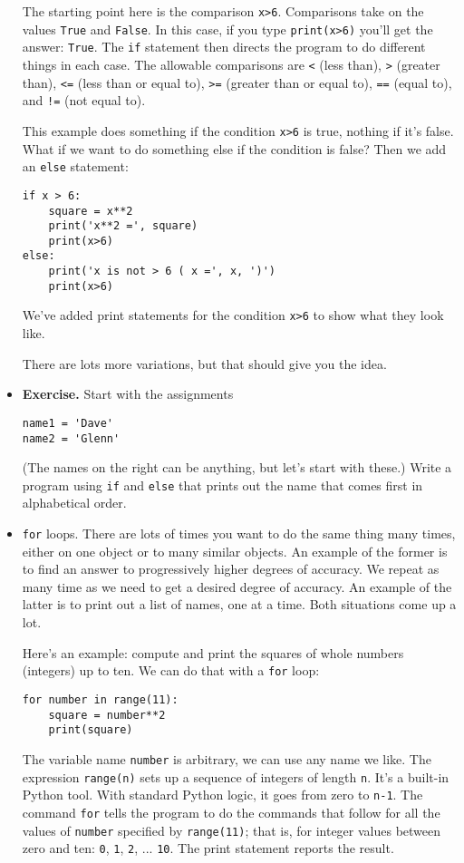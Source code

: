 \documentclass[11pt]{article}
\begin{document}
\begin{itemize}
The starting point here is the comparison {\tt x>6}.
Comparisons take on the values {\tt True} and {\tt False}.
In this case, if you type {\tt print(x>6)} you'll get the answer:  {\tt True}.
The {\tt if} statement then directs the program to do different things in each case.
The allowable comparisons are
{\tt <} (less than), {\tt >} (greater than), {\tt <=} (less than or equal to),
{\tt >=} (greater than or equal to), {\tt ==} (equal to), and {\tt !=} (not equal to).

This example does something if the condition {\tt x>6} is true, nothing if it's false.
What if we want to do something else if the condition is false?
Then we add an {\tt else} statement:
\begin{verbatim}
if x > 6:
    square = x**2
    print('x**2 =', square)
    print(x>6)
else:
    print('x is not > 6 ( x =', x, ')')
    print(x>6)
\end{verbatim}
We've added print statements for the condition {\tt x>6} to show what they look like.

There are lots more variations, but that should give you the idea.

\item {\bf Exercise.} Start with the assignments
\begin{verbatim}
name1 = 'Dave'
name2 = 'Glenn'
\end{verbatim}
(The names on the right can be anything, but let's start with these.)
Write a program using {\tt if} and {\tt else} that prints out the name
that comes first in alphabetical order.

\begin{comment}
name1 = 'Dave'
name2 = 'Glenn'

if name1 < name2:
    print(name1)
else:
    print(name2)
\end{comment}


\item {\tt for} loops.
There are lots of times you want to do the same thing many times,
either on one object or to many similar objects.
An example of the former is to find an answer to progressively higher degrees of accuracy.
We repeat as many time as we need to get a desired degree of accuracy.
An example of the latter is to print out a list of names, one at a time.
Both situations come up a lot.

Here's an example:
compute and print the squares of whole numbers (integers) up to ten.
We can do that with a {\tt for} loop:
%
\begin{verbatim}
for number in range(11):
    square = number**2
    print(square)
\end{verbatim}
The variable name {\tt number} is arbitrary, we can use any name we like.
The expression {\tt range(n)} sets up a sequence of integers of length {\tt n}.
It's a built-in Python tool.
With standard Python logic, it goes from zero to {\tt n-1}.
The command {\tt for} tells the program to do the commands that follow
for all the values of {\tt number}
specified by {\tt range(11)};
that is, for integer values between zero and ten:
{\tt 0}, {\tt 1}, {\tt 2}, ... {\tt 10}.
The print statement reports the result.


\end{itemize}
\end{document}
